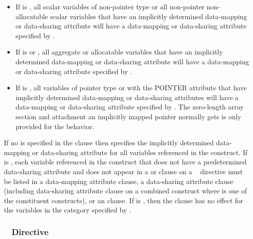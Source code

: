 \begin{itemize}

  \item If  is , all scalar variables of
    non-pointer type or all non-pointer non-allocatable scalar variables that
    have an implicitly determined data-mapping or data-sharing attribute will
    have a data-mapping or data-sharing attribute specified by
    .

  \item  If  is  or ,
    all aggregate or allocatable variables that have an implicitly determined
    data-mapping or data-sharing attribute will have a data-mapping or
    data-sharing attribute specified by .

  \item If  is , all variables of pointer
    type or with the POINTER attribute that have implicitly determined
    data-mapping or data-sharing attributes will have a data-mapping or
    data-sharing attribute specified by .  The
    zero-length array section and attachment an implicitly mapped pointer
    normally gets is only provided for the  behavior.

\end{itemize}

If no  is specified in the clause then
 specifies the implicitly determined data-mapping or
data-sharing attribute for all variables referenced in the construct.  If
 is , each variable referenced in the
construct that does not have a predetermined data-sharing attribute and does
not appear in a  or  clause on a ~
directive must be listed in a data-mapping attribute clause, a data-sharing
attribute clause (including data-sharing attribute clause on a combined
construct where  is one of the constituent constructs), or
an  clause. If  is ,
then the clause has no effect for the variables in the category specified by
.




\subsubsection{~ Directive}
\label{subsubsec:declare mapper Directive}

